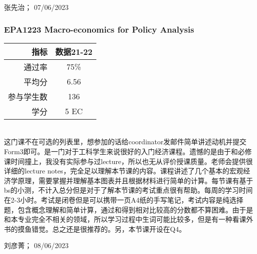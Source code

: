 \begin{flushright}
张先治； 07/06/2023
\end{flushright}

\subsubsection{EPA1223 Macro-economics for Policy Analysis}

\begin{minipage}{0.45\textwidth}
\centering
{}
\end{minipage}%
\begin{minipage}{0.45\textwidth}
\raggedleft
\begin{tabular}{r|c}
\textbf{指标} & \textbf{数据21-22} \\ \hline
通过率 &75\% \\ 
平均分 & 6.56 \\ 
参与学生数 &136 \\
学分 & 5 EC\\
\end{tabular}
\end{minipage}\\

这门课不在可选的列表里，想参加的话给coordinator发邮件简单讲述动机并提交Form3即可。是一门对于工科学生来说很好的入门经济课程。遗憾的是由于和必修课时间撞上，我没有实际参与过lecture，所以也无从评价授课质量。老师会提供很详细的lecture notes，完全足以理解本节课的内容。课程讲述了几个基本的宏观经济学原理，需要掌握并理解基本图表并且根据材料进行简单的计算。每节课有基于bs的小测，不计入总分但是对于了解本节课的考试重点很有帮助。每周的学习时间在2-3小时。考试是闭卷但是可以携带一页A4纸的手写笔记，考试内容是纯选择题，包含概念理解和简单计算，通过和得到相对比较高的分数都不算困难。由于是和本专业完全不相关的领域，所以学习过程中生词可能比较多，但是有一种看课外书的摸鱼错觉。总之还是很推荐的。另，本节课开设在Q4。

\begin{flushright}
刘彦菁； 08/06/2023
\end{flushright}